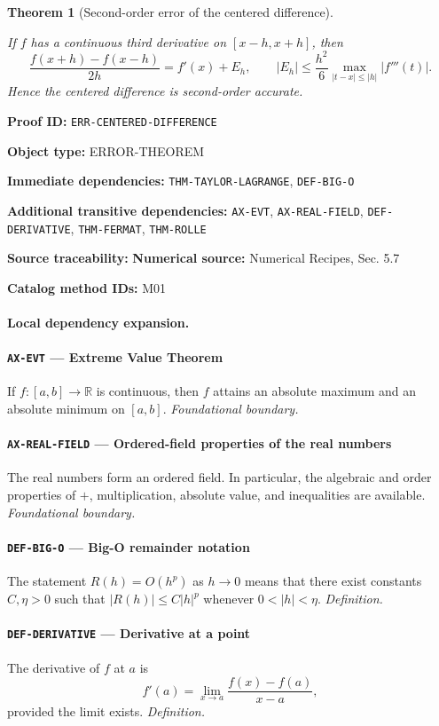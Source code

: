 \documentclass[10pt]{article}
\newcommand{\pidraw}[1]{\begingroup\urlstyle{tt}\nolinkurl{#1}\endgroup}
\newtheorem{theorem}{Theorem}[section]
\theoremstyle{definition}
\theoremstyle{remark}
\newcommand{\meta}[2]{\noindent\textbf{#1:} #2\par}
\begin{document}
\begin{theorem}[Second-order error of the centered difference]\label{prf:ERR-CENTERED-DIFFERENCE}

If $f$ has a continuous third derivative on $[x-h,x+h]$, then
\[
\frac{f(x+h)-f(x-h)}{2h}=f'(x)+E_h,
\qquad
|E_h|\le \frac{h^2}{6}\max_{|t-x|\le|h|}|f'''(t)|.
\]
Hence the centered difference is second-order accurate.

\end{theorem}

\meta{Proof ID}{\pidraw{ERR-CENTERED-DIFFERENCE}}
\meta{Object type}{ERROR-THEOREM}
\meta{Immediate dependencies}{\pidraw{THM-TAYLOR-LAGRANGE}, \pidraw{DEF-BIG-O}}
\meta{Additional transitive dependencies}{\pidraw{AX-EVT}, \pidraw{AX-REAL-FIELD}, \pidraw{DEF-DERIVATIVE}, \pidraw{THM-FERMAT}, \pidraw{THM-ROLLE}}
\meta{Source traceability}{\textbf{Numerical source:} Numerical Recipes, Sec. 5.7}
\meta{Catalog method IDs}{M01}

\paragraph{Local dependency expansion.}

\paragraph{\pidraw{AX-EVT} --- Extreme Value Theorem}
If $f:[a,b]\to\mathbb{R}$ is continuous, then $f$ attains an absolute maximum and an absolute minimum on $[a,b]$.
\textit{Foundational boundary.}

\paragraph{\pidraw{AX-REAL-FIELD} --- Ordered-field properties of the real numbers}
The real numbers form an ordered field. In particular, the algebraic and order properties of $+$, multiplication, absolute value, and inequalities are available.
\textit{Foundational boundary.}

\paragraph{\pidraw{DEF-BIG-O} --- Big-O remainder notation}
The statement $R(h)=O(h^p)$ as $h\to0$ means that there exist constants $C,\eta>0$ such that $|R(h)|\le C|h|^p$ whenever $0<|h|<\eta$.
\textit{Definition.}

\paragraph{\pidraw{DEF-DERIVATIVE} --- Derivative at a point}
The derivative of $f$ at $a$ is
\[
f'(a)=\lim_{x\to a}\frac{f(x)-f(a)}{x-a},
\]
provided the limit exists.
\textit{Definition.}
\end{document}
